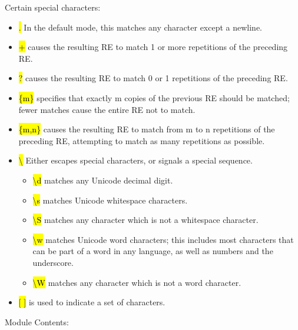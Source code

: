 Certain special characters:
\begin{itemize}
\item \hl{.} In the default mode, this matches any character except a newline.
\item \hl{+} causes the resulting RE to match 1 or more repetitions of the preceding RE.
\item \hl{?} causes the resulting RE to match 0 or 1 repetitions of the preceding RE. 
\item \hl{\{m\}} specifies that exactly m copies of the previous RE should be matched; fewer matches cause the entire RE not to match. 
\item \hl{\{m,n\}} causes the resulting RE to match from m to n repetitions of the preceding RE, attempting to match as many repetitions as possible.
\item \hl{\textbackslash} Either escapes special characters, or signals a special sequence.
\begin{itemize}
\item \hl{\textbackslash d} matches any Unicode decimal digit.
\item \hl{\textbackslash s} matches Unicode whitespace characters.
\item \hl{\textbackslash S} matches any character which is not a whitespace character.
\item \hl{\textbackslash w} matches Unicode word characters; this includes most characters that can be part of a word in any language, as well as numbers and the underscore.
\item \hl{\textbackslash W} matches any character which is not a word character.
\end{itemize}
\item \hl{[ ]} is used to indicate a set of characters.
\end{itemize}
Module Contents:
